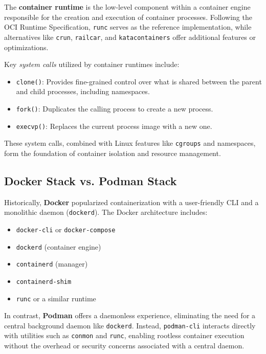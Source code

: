 The \textbf{container runtime} is the low-level component within a container engine responsible for the creation and execution of container processes. Following the OCI Runtime Specification, \texttt{runc} serves as the reference implementation, while alternatives like \texttt{crun}, \texttt{railcar}, and \texttt{katacontainers} offer additional features or optimizations.


Key \textit{system calls} utilized by container runtimes include:
\begin{itemize}
    \item \texttt{clone()}: Provides fine-grained control over what is shared between the parent and child processes, including namespaces.
    \item \texttt{fork()}: Duplicates the calling process to create a new process.
    \item \texttt{execvp()}: Replaces the current process image with a new one.
\end{itemize}

These system calls, combined with Linux features like \texttt{cgroups} and namespaces, form the foundation of container isolation and resource management.

\subsection{Docker Stack vs. Podman Stack}

Historically, \textbf{Docker} popularized containerization with a user-friendly CLI and a monolithic daemon (\texttt{dockerd}). The Docker architecture includes:
\begin{itemize}
    \item \texttt{docker-cli} or \texttt{docker-compose}
    \item \texttt{dockerd} (container engine)
    \item \texttt{containerd} (manager)
    \item \texttt{containerd-shim}
    \item \texttt{runc} or a similar runtime
\end{itemize}

In contrast, \textbf{Podman} offers a daemonless experience, eliminating the need for a central background daemon like \texttt{dockerd}. Instead, \texttt{podman-cli} interacts directly with utilities such as \texttt{conmon} and \texttt{runc}, enabling rootless container execution without the overhead or security concerns associated with a central daemon.

